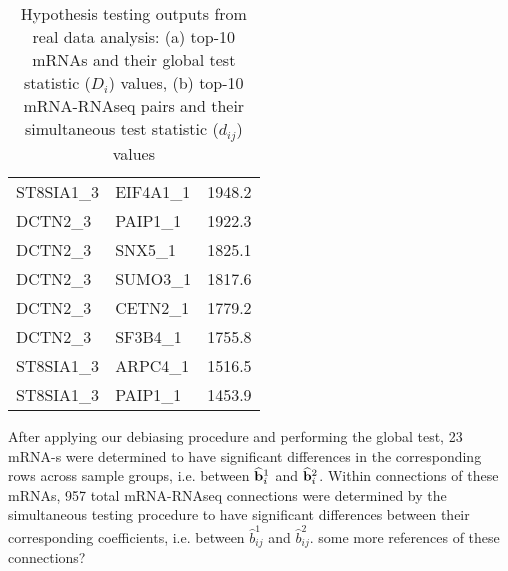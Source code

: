 \begin{table}[t!]
\begin{minipage}{.5\linewidth}
\begin{tabular}{lll}
ST8SIA1\_3 & EIF4A1\_1  & 1948.2    \\ 
DCTN2\_3   & PAIP1\_1   & 1922.3    \\ 
DCTN2\_3   & SNX5\_1    & 1825.1    \\ 
DCTN2\_3   & SUMO3\_1   & 1817.6    \\ 
DCTN2\_3   & CETN2\_1   & 1779.2    \\ 
DCTN2\_3   & SF3B4\_1   & 1755.8    \\ 
ST8SIA1\_3 & ARPC4\_1   & 1516.5    \\ 
ST8SIA1\_3 & PAIP1\_1   & 1453.9    \\\hline
\end{tabular}
\end{minipage}
\caption{Hypothesis testing outputs from real data analysis: (a) top-10 mRNAs and their global test statistic ($D_i$) values, (b) top-10 mRNA-RNAseq pairs and their simultaneous test statistic ($d_{ij}$) values}
\label{table:realtesting}
\end{table}

After applying our debiasing procedure and performing the global test, 23 mRNA-s were determined to have significant differences in the corresponding rows across sample groups, i.e. between $\widehat {{\bf{b}}}_i^1$ and $\widehat {{\bf{b}}}_i^2$. Within connections of these mRNAs, 957 total mRNA-RNAseq connections were determined by the simultaneous testing procedure to have significant differences between their corresponding coefficients, i.e. between $\hat b_{ij}^1$ and $\hat b_{ij}^2$. {\colrbf some more references of these connections?}
